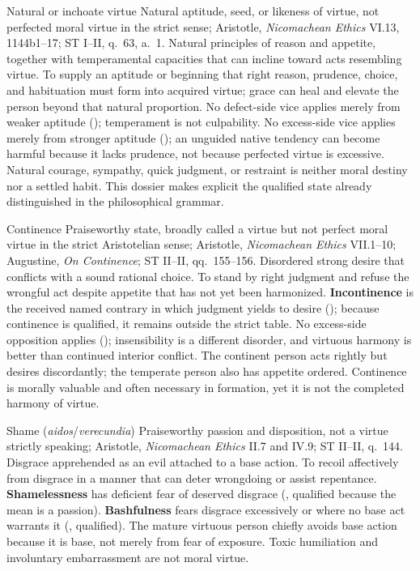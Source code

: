 \virtuedossier
  {Natural or inchoate virtue}
  {Natural aptitude, seed, or likeness of virtue, not perfected moral virtue in the strict sense; Aristotle, \emph{Nicomachean Ethics} VI.13, 1144b1--17; ST I--II, q.~63, a.~1.}
  {Natural principles of reason and appetite, together with temperamental capacities that can incline toward acts resembling virtue.}
  {To supply an aptitude or beginning that right reason, prudence, choice, and habituation must form into acquired virtue; grace can heal and elevate the person beyond that natural proportion.}
  {No defect-side vice applies merely from weaker aptitude (); temperament is not culpability.}
  {No excess-side vice applies merely from stronger aptitude (); an unguided native tendency can become harmful because it lacks prudence, not because perfected virtue is excessive.}
  {Natural courage, sympathy, quick judgment, or restraint is neither moral destiny nor a settled habit. This dossier makes explicit the qualified state already distinguished in the philosophical grammar.}

\virtuedossier
  {Continence}
  {Praiseworthy state, broadly called a virtue but not perfect moral virtue in the strict Aristotelian sense; Aristotle, \emph{Nicomachean Ethics} VII.1--10; Augustine, \emph{On Continence}; ST II--II, qq.~155--156.}
  {Disordered strong desire that conflicts with a sound rational choice.}
  {To stand by right judgment and refuse the wrongful act despite appetite that has not yet been harmonized.}
  {\textbf{Incontinence} is the received named contrary in which judgment yields to desire (); because continence is qualified, it remains outside the strict table.}
  {No excess-side opposition applies (); insensibility is a different disorder, and virtuous harmony is better than continued interior conflict.}
  {The continent person acts rightly but desires discordantly; the temperate person also has appetite ordered. Continence is morally valuable and often necessary in formation, yet it is not the completed harmony of virtue.}

\virtuedossier
  {Shame (\emph{aidos}/\emph{verecundia})}
  {Praiseworthy passion and disposition, not a virtue strictly speaking; Aristotle, \emph{Nicomachean Ethics} II.7 and IV.9; ST II--II, q.~144.}
  {Disgrace apprehended as an evil attached to a base action.}
  {To recoil affectively from disgrace in a manner that can deter wrongdoing or assist repentance.}
  {\textbf{Shamelessness} has deficient fear of deserved disgrace (, qualified because the mean is a passion).}
  {\textbf{Bashfulness} fears disgrace excessively or where no base act warrants it (, qualified).}
  {The mature virtuous person chiefly avoids base action because it is base, not merely from fear of exposure. Toxic humiliation and involuntary embarrassment are not moral virtue.}

